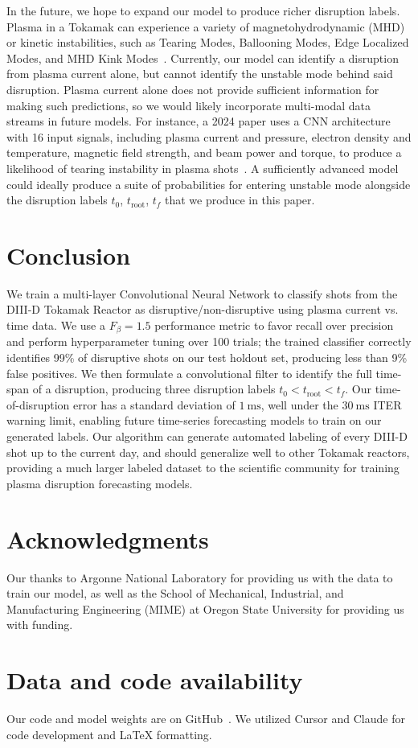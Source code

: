 \documentclass[twocolumn]{article}
\begin{document}
 In the future, we hope to expand our model to produce richer disruption labels. Plasma in a Tokamak can experience a variety of magnetohydrodynamic (MHD) or kinetic instabilities, such as Tearing Modes, Ballooning Modes, Edge Localized Modes, and MHD Kink Modes~\cite{Brennan2002}. Currently, our model can identify a disruption from plasma current alone, but cannot identify the unstable mode behind said disruption. Plasma current alone does not provide sufficient information for making such predictions, so we would likely incorporate multi-modal data streams in future models. For instance, a 2024 paper uses a CNN architecture with 16 input signals, including plasma current and pressure, electron density and temperature, magnetic field strength, and beam power and torque, to produce a likelihood of tearing instability in plasma shots~\cite{egemen2023}. A sufficiently advanced model could ideally produce a suite of probabilities for entering unstable mode alongside the disruption labels $t_0$, $t_\mathrm{root}$, $t_f$ that we produce in this paper. 


\section{Conclusion}
\label{sec:conclusion}

We train a multi-layer Convolutional Neural Network to classify shots from the DIII-D Tokamak Reactor as disruptive/non-disruptive using plasma current vs. time data. We use a $F_\beta=1.5$ performance metric to favor recall over precision and perform hyperparameter tuning over 100 trials; the trained classifier correctly identifies 99\% of disruptive shots on our test holdout set, producing less than 9\% false positives. We then formulate a convolutional filter to identify the full time-span of a disruption, producing three disruption labels $t_0<t_\mathrm{root}<t_f$. Our time-of-disruption error has a standard deviation of $\qty{1}{\milli\s}$, well under the $\qty{30}{\milli\s}$ ITER warning limit, enabling future time-series forecasting models to train on our generated labels. Our algorithm can generate automated labeling of every DIII-D shot up to the current day, and should generalize well to other Tokamak reactors, providing a much larger labeled dataset to the scientific community for training plasma disruption forecasting models.


\section*{Acknowledgments}
Our thanks to Argonne National Laboratory for providing us with the data to train our model, as well as the School of Mechanical, Industrial, and Manufacturing Engineering (MIME) at Oregon State University for providing us with funding.

\section*{Data and code availability}
Our code and model weights are on GitHub~\cite{github}. We utilized Cursor \cite{cursor2026} and Claude \cite{claude2026} for code development and LaTeX formatting.

\printbibliography
\end{document}
